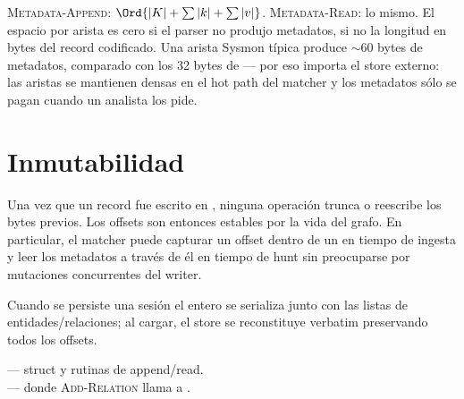\begin{complexity}
\textsc{Metadata-Append}: $\Ord{|K| + \sum |k| + \sum |v|}$.
\textsc{Metadata-Read}: lo mismo. El espacio por arista es cero
si el parser no produjo metadatos, si no la longitud en bytes del
record codificado. Una arista Sysmon típica produce $\sim$60
bytes de metadatos, comparado con los 32 bytes de \Compact{} ---
por eso importa el store externo: las aristas se mantienen
densas en el hot path del matcher y los metadatos sólo se pagan
cuando un analista los pide.
\end{complexity}

\section{Inmutabilidad}

\begin{invariant}
Una vez que un record fue escrito en ,
ninguna operación trunca o reescribe los bytes previos. Los
offsets son entonces estables por la vida del grafo. En
particular, el matcher puede capturar un offset dentro de un
\Compact{} en tiempo de ingesta y leer los metadatos a través de
él en tiempo de hunt sin preocuparse por mutaciones concurrentes
del writer.
\end{invariant}

Cuando se persiste una sesión el  entero
se serializa junto con las listas de entidades/relaciones; al
cargar, el store se reconstituye verbatim preservando todos los
offsets.

\begin{inthecode}
 --- struct
y rutinas de append/read.\\
 --- donde
\textsc{Add-Relation} llama a .
\end{inthecode}
